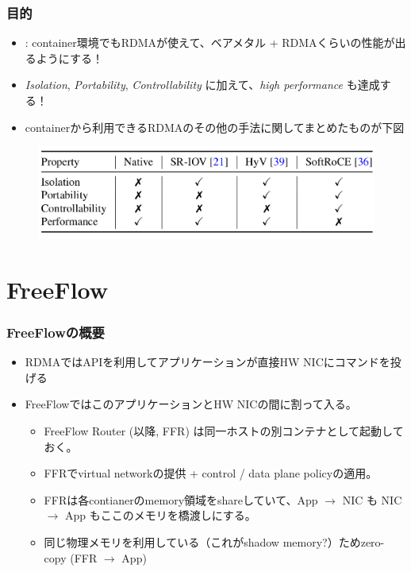 \documentclass[dvipdfmx,9pt,notheorems]{beamer}
\theoremstyle{definition}
\begin{document}
\begin{frame}\frametitle{目的}
	\begin{itemize}
		\item {} : container環境でもRDMAが使えて、ベアメタル + RDMAくらいの性能が出るようにする！
		\item \textit{Isolation}, \textit{Portability}, \textit{Controllability} に加えて、\textit{high performance} も達成する！
		\item containerから利用できるRDMAのその他の手法に関してまとめたものが下図
	\end{itemize}
  \begin{figure}[htb]
    \centering
    \includegraphics[scale=1]{fig/table1.png}
  \end{figure}%
\end{frame}
\section{FreeFlow}
\begin{frame}\frametitle{FreeFlowの概要}
	\begin{itemize}
		\item RDMAではAPIを利用してアプリケーションが直接HW NICにコマンドを投げる
		\item FreeFlowではこのアプリケーションとHW NICの間に割って入る。
		\begin{itemize}
			\item FreeFlow Router (以降, FFR) は同一ホストの別コンテナとして起動しておく。
			\item FFRでvirtual networkの提供 + control / data plane policyの適用。
			\item FFRは各contianerのmemory領域をshareしていて、App $\rightarrow$ NIC も NIC $\rightarrow$ App もここのメモリを橋渡しにする。
			\item 同じ物理メモリを利用している（これがshadow memory?）ためzero-copy (FFR $\rightarrow$ App)
		\end{itemize}
	\end{itemize}
\end{frame}
\end{document}
